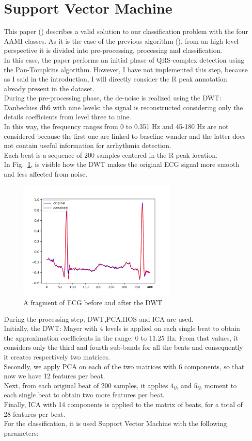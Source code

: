 \documentclass[LaM,binding=0.6cm]{sapthesis}
\begin{document}
\section{Support Vector Machine \cite{svmnl}}
This paper (\cite{svmnl}) describes a valid solution to our classification problem with the four AAMI classes. As it is the case of the previous algorithm (\cite{forest}), from an high level perspective it is divided into pre-processing, processing and classification.\\In this case, the paper performs an initial phase of QRS-complex detection using the Pan-Tompkins algorithm. However, I have not implemented this step, because as I said in the introduction, I will directly consider the R peak annotation already present in the dataset.\\During the pre-processing phase, the de-noise is realized using the DWT: Daubechies db6 with nine levels: the signal is reconstructed considering only the details coefficients from level three to nine.\\In this way, the frequency ranges from 0 to 0.351 Hz and 45-180 Hz are not considered because the first one are linked to baseline wander and the latter does not contain useful information for arrhythmia detection.\\Each beat is a sequence of 200 samples centered in the R peak location.\\In Fig.~\ref{fig:svc1}, is visible how the DWT makes the original ECG signal more smooth and less affected from noise.
\begin{figure}[H]  \centering
	\includegraphics[width=80mm,scale=0.7]{svm-before-after}
	\caption{A fragment of ECG before and after the DWT}
	\label{fig:svc1}
\end{figure}
During the processing step, DWT,PCA,HOS and ICA are used.\\Initially, the DWT: Mayer with 4 levels is 
applied on each single beat to obtain the approximation coefficients in the range: 0 to 11.25 Hz. From that values, it considers only the third and fourth sub-bands for all the beats and consequently it creates respectively two matrices.\\Secondly, we apply PCA on each of the two matrices with 6 components, so that now we have 12 features per beat.\\Next, from each original beat of 200 samples, it applies $4_{th}$ and $5_{th}$ moment to each single beat to obtain two more features per beat.\\Finally, ICA with 14 components is applied to the matrix of beats, for a total of 28 features per beat.\\For the classification, it is used Support Vector Machine with the following parameters:
\end{document}

